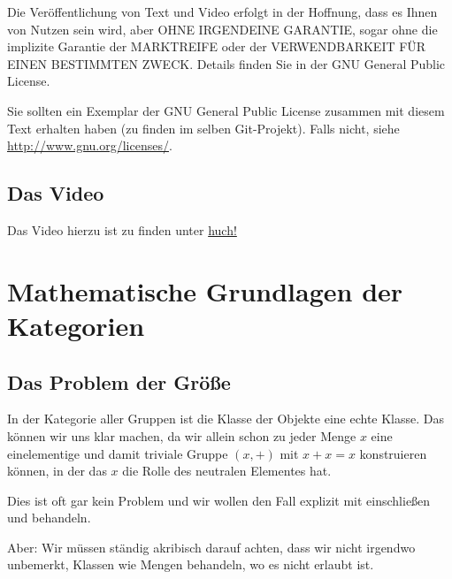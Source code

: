 \documentclass[a4paper]{amsart}
\theoremstyle{definition}
\begin{document}
Die Veröffentlichung von Text und Video erfolgt in der Hoffnung, dass es Ihnen von Nutzen sein wird,
aber OHNE IRGENDEINE GARANTIE, sogar ohne die implizite Garantie der MARKTREIFE oder der
VERWENDBARKEIT FÜR EINEN BESTIMMTEN ZWECK. Details finden Sie in der GNU General Public License.

Sie sollten ein Exemplar der GNU General Public License zusammen mit diesem Text erhalten haben
(zu finden im selben Git-Projekt).
Falls nicht, siehe \url{http://www.gnu.org/licenses/}.

\subsection*{Das Video}
Das Video hierzu ist zu finden unter
{\tiny
   \url{huch!}
}

\section{Mathematische Grundlagen der Kategorien}

\subsection{Das Problem der Größe}
In der Kategorie aller Gruppen ist die Klasse der Objekte eine echte Klasse. Das können wir uns klar machen, da wir allein schon zu jeder Menge $x$ eine einelementige und damit triviale Gruppe $( {x}, +)$ mit $x + x = x$ konstruieren können, in der das $x$ die Rolle des neutralen Elementes hat.

Dies ist oft gar kein Problem und wir wollen den Fall explizit mit einschließen und behandeln.

Aber: Wir müssen ständig akribisch darauf achten, dass wir nicht irgendwo unbemerkt, Klassen wie Mengen behandeln, wo es nicht erlaubt ist.
\end{document}
